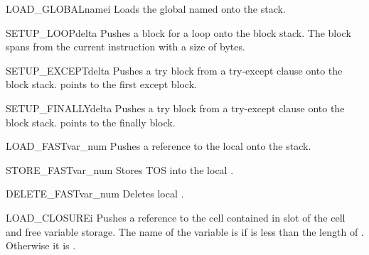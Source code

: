 

\begin{opcodedesc}{LOAD_GLOBAL}{namei}
Loads the global named  onto the stack.
\end{opcodedesc}


\begin{opcodedesc}{SETUP_LOOP}{delta}
Pushes a block for a loop onto the block stack.  The block spans
from the current instruction with a size of  bytes.
\end{opcodedesc}

\begin{opcodedesc}{SETUP_EXCEPT}{delta}
Pushes a try block from a try-except clause onto the block stack.
 points to the first except block.
\end{opcodedesc}

\begin{opcodedesc}{SETUP_FINALLY}{delta}
Pushes a try block from a try-except clause onto the block stack.
 points to the finally block.
\end{opcodedesc}

\begin{opcodedesc}{LOAD_FAST}{var_num}
Pushes a reference to the local  onto
the stack.
\end{opcodedesc}

\begin{opcodedesc}{STORE_FAST}{var_num}
Stores TOS into the local .
\end{opcodedesc}

\begin{opcodedesc}{DELETE_FAST}{var_num}
Deletes local .
\end{opcodedesc}

\begin{opcodedesc}{LOAD_CLOSURE}{i}
Pushes a reference to the cell contained in slot  of the
cell and free variable storage.  The name of the variable is 
 if  is less than the length of
.  Otherwise it is 
.
\end{opcodedesc}

